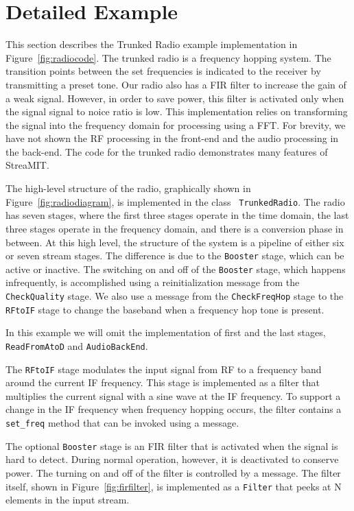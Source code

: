 \section{Detailed Example}
\label{sec:example}
This section describes the Trunked Radio example implementation in
Figure~\ref{fig:radiocode}. The trunked radio is a frequency hopping
system. The transition points between the set frequencies is indicated
to the receiver by transmitting a preset tone. Our radio also has a
FIR filter to increase the gain of a weak signal. However, in order to
save power, this filter is activated only when the signal signal to
noice ratio is low.  This implementation relies on transforming the
signal into the frequency domain for processing using a FFT. For
brevity, we have not shown the RF processing in the front-end and the
audio processing in the back-end.  The code for the trunked radio
demonstrates many features of StreaMIT.

The high-level structure of the radio, graphically shown in
Figure~\ref{fig:radiodiagram}, is implemented in the class {\tt
TrunkedRadio}. The radio has seven stages, where the first three
stages operate in the time domain, the last three stages operate in
the frequency domain, and there is a conversion phase in between.  At
this high level, the structure of the system is a pipeline of either
six or seven stream stages. The difference is due to the {\tt Booster}
stage, which can be active or inactive. The switching on and off of
the {\tt Booster} stage, which happens infrequently, is accomplished
using a reinitialization message from the {\tt CheckQuality} stage. We
also use a message from the {\tt CheckFreqHop} stage to the {\tt
RFtoIF} stage to change the baseband when a frequency hop tone is
present.

In this example we will omit the implementation of first and the last
stages, {\tt ReadFromAtoD} and {\tt AudioBackEnd}.

The {\tt RFtoIF} stage modulates the input signal from RF to a
frequency band around the current IF frequency. This stage is
implemented as a filter that multiplies the current signal with a sine
wave at the IF frequency.  To support a change in the IF frequency
when frequency hopping occurs, the filter contains a {\tt set\_freq}
method that can be invoked using a message.

The optional {\tt Booster} stage is an FIR filter that is activated
when the signal is hard to detect. During normal operation, however,
it is deactivated to conserve power. The turning on and off of the
filter is controlled by a message.  The filter itself, shown in
Figure~\ref{fig:firfilter}, is implemented as a {\tt Filter} that
peeks at N elements in the input stream.

